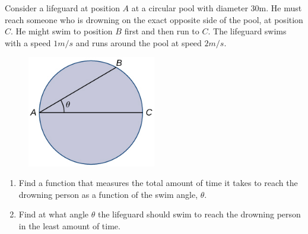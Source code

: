 \documentclass[12pt]{amsart}
\begin{document}
\newpage

\begin{problem}[20 points]
Consider a lifeguard at position $A$ at a circular pool with diameter  30m.
He must reach someone who is drowning on the exact opposite side of the pool, at position  $C$.
He might swim to position $B$ first and then run to $C$.
The lifeguard swims with a speed  $1m/s$ and runs around the pool at speed  $2m/s$.

\begin{figure}[ht]
	\begin{center}
		\includegraphics[width=0.5\textwidth]{pool.jpeg}
	\end{center}
\end{figure}
\begin{enumerate}
	\item Find a function that measures the total amount of time it takes to reach the drowning person as a function of the swim angle,  $\theta$.
	      \vspace{7cm}
	\item Find at what angle  $\theta$ the lifeguard should swim to reach the drowning person in the least amount of time.
\end{enumerate}

\end{problem}
\end{document}
